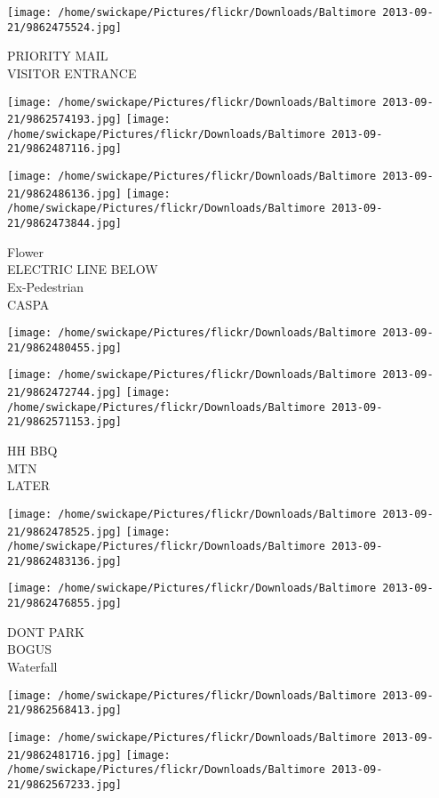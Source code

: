 \documentclass[10pt,letterpaper]{article}
\begin{document}
\vspace{0.25in}
\texttt{[image: /home/swickape/Pictures/flickr/Downloads/Baltimore 2013-09-21/9862475524.jpg]}

PRIORITY MAIL\\
VISITOR ENTRANCE
\pagebreak

\texttt{[image: /home/swickape/Pictures/flickr/Downloads/Baltimore 2013-09-21/9862574193.jpg]}
\texttt{[image: /home/swickape/Pictures/flickr/Downloads/Baltimore 2013-09-21/9862487116.jpg]}

\texttt{[image: /home/swickape/Pictures/flickr/Downloads/Baltimore 2013-09-21/9862486136.jpg]}
\texttt{[image: /home/swickape/Pictures/flickr/Downloads/Baltimore 2013-09-21/9862473844.jpg]}

Flower\\
ELECTRIC LINE BELOW\\
Ex{-}Pedestrian\\
CASPA
\pagebreak

\texttt{[image: /home/swickape/Pictures/flickr/Downloads/Baltimore 2013-09-21/9862480455.jpg]}

\vspace{0.25in}
\texttt{[image: /home/swickape/Pictures/flickr/Downloads/Baltimore 2013-09-21/9862472744.jpg]}
\texttt{[image: /home/swickape/Pictures/flickr/Downloads/Baltimore 2013-09-21/9862571153.jpg]}

HH BBQ\\
MTN\\
LATER
\pagebreak

\texttt{[image: /home/swickape/Pictures/flickr/Downloads/Baltimore 2013-09-21/9862478525.jpg]}
\texttt{[image: /home/swickape/Pictures/flickr/Downloads/Baltimore 2013-09-21/9862483136.jpg]}

\vspace{0.25in}
\texttt{[image: /home/swickape/Pictures/flickr/Downloads/Baltimore 2013-09-21/9862476855.jpg]}

DONT PARK\\
BOGUS\\
Waterfall
\pagebreak

\texttt{[image: /home/swickape/Pictures/flickr/Downloads/Baltimore 2013-09-21/9862568413.jpg]}

\vspace{0.25in}
\texttt{[image: /home/swickape/Pictures/flickr/Downloads/Baltimore 2013-09-21/9862481716.jpg]}
\texttt{[image: /home/swickape/Pictures/flickr/Downloads/Baltimore 2013-09-21/9862567233.jpg]}
\end{document}
